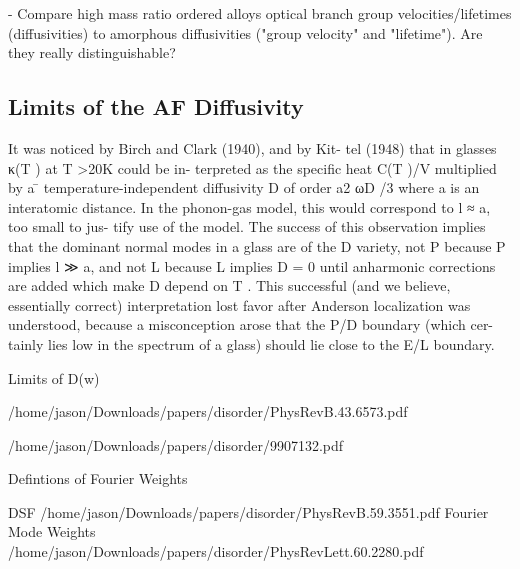 \documentclass[aps,prl,onecolumn,groupedaddress,amsmath,amssymb,12pt]{revtex4}
\begin{document}
- Compare high mass ratio ordered alloys optical branch group velocities/lifetimes (diffusivities) to amorphous diffusivities ("group velocity" and "lifetime"). Are they really distinguishable?


\subsection{\label{S-Motivation-Amorphous}Limits of the AF Diffusivity}

It was noticed by Birch and Clark (1940), and by Kit-
tel (1948) that in glasses κ(T ) at T >20K could be in-
terpreted as the specific heat C(T )/V multiplied by a
 ̄
temperature-independent diffusivity D of order a2 ωD /3
where a is an interatomic distance. In the phonon-gas
model, this would correspond to l ≈ a, too small to jus-
tify use of the model. The success of this observation
implies that the dominant normal modes in a glass are of
the D variety, not P because P implies l ≫ a, and not L
because L implies D = 0 until anharmonic corrections are
added which make D depend on T . This successful (and
we believe, essentially correct) interpretation lost favor
after Anderson localization was understood, because a
misconception arose that the P/D boundary (which cer-
tainly lies low in the spectrum of a glass) should lie close
to the E/L boundary.

Limits of D(w)

/home/jason/Downloads/papers/disorder/PhysRevB.43.6573.pdf


/home/jason/Downloads/papers/disorder/9907132.pdf

Defintions of Fourier Weights

DSF
/home/jason/Downloads/papers/disorder/PhysRevB.59.3551.pdf
Fourier Mode Weights
/home/jason/Downloads/papers/disorder/PhysRevLett.60.2280.pdf
\end{document}
